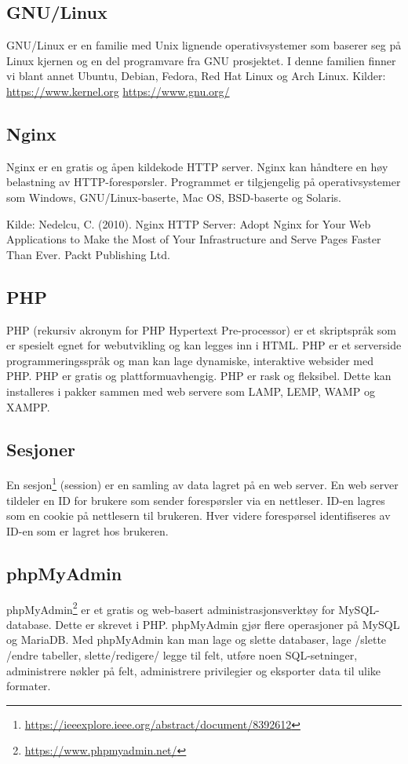 \subsection{GNU/Linux}
GNU/Linux er en familie med Unix lignende operativsystemer som baserer seg på Linux kjernen og en del programvare fra GNU prosjektet.
I denne familien finner vi blant annet Ubuntu, Debian, Fedora, Red Hat Linux og Arch Linux.
Kilder: \url{https://www.kernel.org} \url{https://www.gnu.org/}

\subsection{Nginx}
Nginx er en gratis og åpen kildekode HTTP server. Nginx kan håndtere en høy belastning av HTTP-forespørsler. Programmet er tilgjengelig på operativsystemer som Windows, GNU/Linux-baserte, Mac OS, BSD-baserte og Solaris.

Kilde: Nedelcu, C. (2010). Nginx HTTP Server: Adopt Nginx for Your Web Applications to Make the Most of Your Infrastructure and Serve Pages Faster Than Ever. Packt Publishing Ltd.

\subsection{PHP}
PHP (rekursiv akronym for PHP Hypertext Pre-processor) er et skriptspråk som er spesielt egnet for webutvikling og kan legges inn i HTML. PHP er et serverside programmeringsspråk og man kan lage dynamiske, interaktive websider med PHP. PHP er gratis og plattformuavhengig. PHP er rask og fleksibel. Dette kan installeres i pakker sammen med web servere som LAMP, LEMP, WAMP og XAMPP.

\subsection{Sesjoner}
En sesjon\footnote{\url{https://ieeexplore.ieee.org/abstract/document/8392612}} (session) er en samling av data lagret på en web server. En web server tildeler en ID for brukere som sender forespørsler via en nettleser. ID-en lagres som en cookie på nettlesern til brukeren. Hver videre forespørsel identifiseres av ID-en som er lagret hos brukeren.

\subsection{phpMyAdmin}
phpMyAdmin\footnote{\url{https://www.phpmyadmin.net/}} er et gratis og web-basert administrasjonsverktøy for MySQL-database. Dette er skrevet i PHP. phpMyAdmin gjør flere operasjoner på MySQL og MariaDB. Med phpMyAdmin kan man lage og slette databaser, lage /slette /endre tabeller, slette/redigere/ legge til felt, utføre noen SQL-setninger, administrere nøkler på felt, administrere privilegier og eksporter data til ulike formater.

